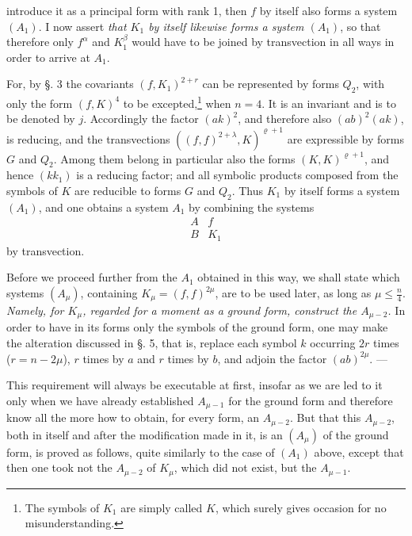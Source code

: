 \documentclass[10pt]{article}
\begin{document}
introduce it as a principal form with rank 1, then $f$ by itself also forms a system $(A_1)$. I now assert \textit{that $K_1$ by itself likewise forms a system $(A_1)$}, so that therefore only $f^\alpha$ and $K_1^\beta$ would have to be joined by transvection in all ways in order to arrive at $A_1$.

For, by §. 3 the covariants $(f,K_1)^{2+r}$ can be represented by forms $Q_2$, with only the form $(f,K)^4$ to be excepted,\footnote{The symbols of $K_1$ are simply called $K$, which surely gives occasion for no misunderstanding.} when $n=4$. It is an invariant and is to be denoted by $j$. Accordingly the factor $(ak)^2$, and therefore also $(ab)^2(ak)$, is reducing, and the transvections $((f,f)^{2+\lambda},K)^{\varrho+1}$ are expressible by forms $G$ and $Q_2$. Among them belong in particular also the forms $(K,K)^{\varrho+1}$, and hence $(kk_1)$ is a reducing factor; and all symbolic products composed from the symbols of $K$ are reducible to forms $G$ and $Q_2$. Thus $K_1$ by itself forms a system $(A_1)$, and one obtains a system $A_1$ by combining the systems
\[
\begin{array}{cc}
A&f\\
B&K_1
\end{array}
\]
by transvection.

Before we proceed further from the $A_1$ obtained in this way, we shall state which systems $(A_\mu)$, containing $K_\mu=(f,f)^{2\mu}$, are to be used later, as long as $\mu\leq\frac n4$. \textit{Namely, for $K_\mu$, regarded for a moment as a ground form, construct the $A_{\mu-2}$.} In order to have in its forms only the symbols of the ground form, one may make the alteration discussed in §. 5, that is, replace each symbol $k$ occurring $2r$ times ($r=n-2\mu$), $r$ times by $a$ and $r$ times by $b$, and adjoin the factor $(ab)^{2\mu}$. ---

This requirement will always be executable at first, insofar as we are led to it only when we have already established $A_{\mu-1}$ for the ground form and therefore know all the more how to obtain, for every form, an $A_{\mu-2}$. But that this $A_{\mu-2}$, both in itself and after the modification made in it, is an $(A_\mu)$ of the ground form, is proved as follows, quite similarly to the case of $(A_1)$ above, except that then one took not the $A_{\mu-2}$ of $K_\mu$, which did not exist, but the $A_{\mu-1}$.
\end{document}
